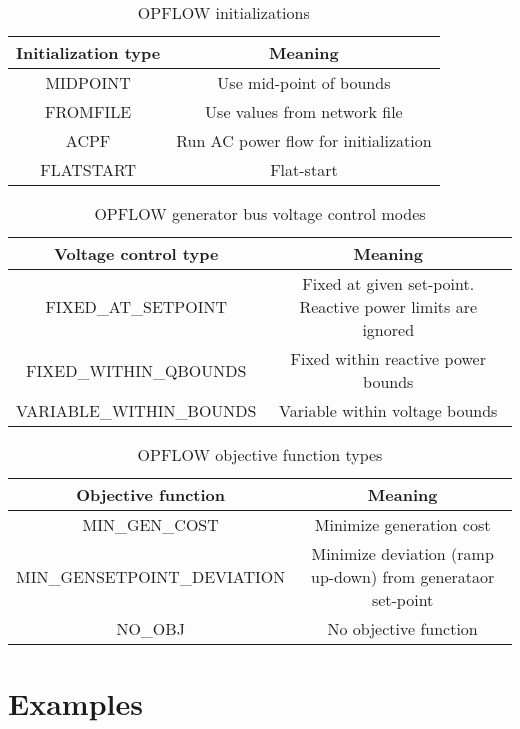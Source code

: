 \begin{table}[!htbp]
  \centering
  \caption{OPFLOW initializations}
  \begin{tabular}{|c|c|}
    \hline
    \textbf{Initialization type} & \textbf{Meaning} \\ \hline
    MIDPOINT & Use mid-point of bounds \\ \hline
    FROMFILE & Use values from network file \\ \hline
    ACPF & Run AC power flow for initialization \\ \hline
    FLATSTART & Flat-start \\ \hline
  \end{tabular}
\label{tab:opflow_initializations}
\end{table}

\begin{table}[!htbp]
  \centering
  \caption{OPFLOW generator bus voltage control modes}
  \begin{tabular}{|c|c|}
    \hline
    \textbf{Voltage control type} & \textbf{Meaning} \\ \hline
    FIXED\_AT\_SETPOINT & Fixed at given set-point. Reactive power limits are ignored \\ \hline
    FIXED\_WITHIN\_QBOUNDS & Fixed within reactive power bounds \\ \hline
    VARIABLE\_WITHIN\_BOUNDS & Variable within voltage bounds \\ \hline
  \end{tabular}
\label{tab:opflow_genbusvoltage}
\end{table}

\begin{table}[!htbp]
  \centering
  \caption{OPFLOW objective function types}
  \begin{tabular}{|c|c|}
    \hline
    \textbf{Objective function} & \textbf{Meaning} \\ \hline
    MIN\_GEN\_COST & Minimize generation cost \\ \hline
    MIN\_GENSETPOINT\_DEVIATION & Minimize deviation (ramp up-down) from generataor set-point \\ \hline
    NO\_OBJ & No objective function \\ \hline
  \end{tabular}
\label{tab:opflow_objtypes}
\end{table}


\section{Examples}

